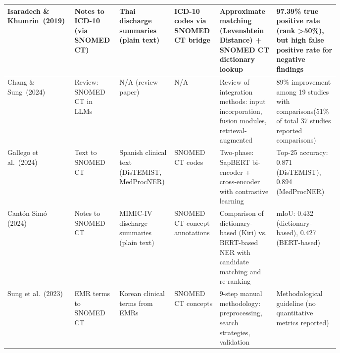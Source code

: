 \begin{longtable}{|L{0.11\linewidth}|L{0.11\linewidth}|L{0.12\linewidth}|L{0.12\linewidth}|L{0.16\linewidth}|L{0.16\linewidth}|}
Isaradech \& Khumrin~(2019) \cite{Isaradech:2019} & Notes to ICD-10 (via SNOMED CT) & Thai discharge summaries (plain text) & ICD-10 codes via SNOMED CT bridge & Approximate matching (Levenshtein Distance) + SNOMED CT dictionary lookup & 97.39\% true positive rate (rank >50\%), but high false positive rate for negative findings \\
\hline

Chang \& Sung~(2024) \cite{Chang:2024} & Review: SNOMED CT in LLMs & N/A (review paper) & N/A & Review of integration methods: input incorporation, fusion modules, retrieval-augmented & 89\% improvement among 19 studies with comparisons\newline (51\% of total 37 studies reported comparisons) \\
\hline

Gallego et al.~(2024) \cite{Gallego:2024} & Text to SNOMED CT & Spanish clinical text (DisTEMIST, MedProcNER) & SNOMED CT codes & Two-phase: SapBERT bi-encoder + cross-encoder with contrastive learning & Top-25 accuracy: 0.871 (DisTEMIST), 0.894 (MedProcNER) \\ \hline

Cantón Simó (2024) \cite{Canton:2024} & Notes to SNOMED CT & MIMIC-IV discharge summaries (plain text) & SNOMED CT concept annotations & Comparison of dictionary-based (Kiri) vs. BERT-based NER with candidate matching and re-ranking & mIoU: 0.432 (dictionary-based), 0.427 (BERT-based) \\
\hline

Sung et al.~(2023) \cite{Sung:2023} & EMR terms to SNOMED CT & Korean clinical terms from EMRs & SNOMED CT concepts & 9-step manual methodology: preprocessing, search strategies, validation & Methodological guideline (no quantitative metrics reported) \\
\hline


\end{longtable}
